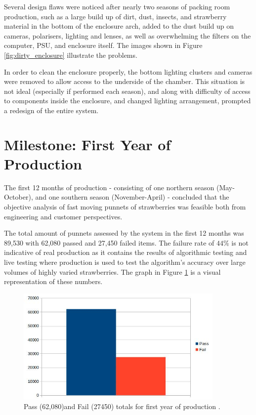 \documentclass[fleqn,twoside,12pt]{report}
\begin{document}
Several design flaws were noticed after nearly two seasons of packing room production, such as a large build up of dirt, dust, insects, and strawberry material in the bottom of the enclosure arch, added to the dust build up on cameras, polarisers, lighting and lenses, as well as overwhelming the filters on the computer, PSU, and enclosure itself. The images shown in Figure \ref{fig:dirty_enclosure} illustrate the problems.


In order to clean the enclosure properly, the bottom lighting clusters and cameras were removed to allow access to the underside of the chamber. This situation is not ideal (especially if performed each season), and along with difficulty of access to components inside the enclosure, and changed lighting arrangement, prompted a redesign of the entire system. 

\section{Milestone: First Year of Production}


The first 12 months of production - consisting of one northern season (May-October), and one southern season (November-April) - concluded that the objective analysis of fast moving punnets of strawberries was feasible both from engineering and customer perspectives. 

The total amount of punnets assessed by the system in the first 12 months was 89,530 with 62,080 passed and 27,450 failed items. The failure rate of $44\%$ is not indicative of real production as it contains the results of algorithmic testing and live testing where production is used to test the algorithm's accuracy over large volumes of highly varied strawberries. The graph in Figure \ref{fig:first_year} is a visual representation of these numbers.  


\begin{figure}[h]
	\centering
	\includegraphics[width=0.9\textwidth]{first_year.jpg}
	\caption{Pass (62,080)and Fail (27450) totals for first year of production .}
	\label{fig:first_year}
\end{figure}
\end{document}
